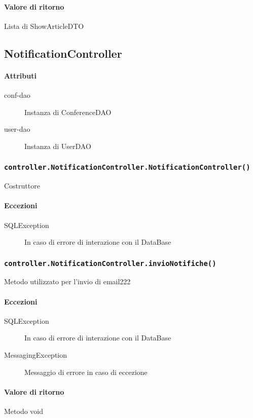 \paragraph{Valore di ritorno}
Lista di ShowArticleDTO



\subsection{NotificationController}
\paragraph{Attributi}
\begin{description}
\item[conf-dao] Instanza di ConferenceDAO
\item[user-dao] Instanza di UserDAO
\end{description}

\subsubsection{\texttt{controller.NotificationController.NotificationController()}}
Costruttore
\paragraph{Eccezioni}
\begin{description}
\item[SQLException] In caso di errore di interazione con il DataBase
\end{description}

\subsubsection{\texttt{controller.NotificationController.invioNotifiche()}}
Metodo utilizzato per l'invio di email222
\paragraph{Eccezioni}
\begin{description}
\item[SQLException] In caso di errore di interazione con il DataBase
\item[MessagingException] Messaggio di errore in caso di eccezione
\end{description}
\paragraph{Valore di ritorno}
Metodo void

